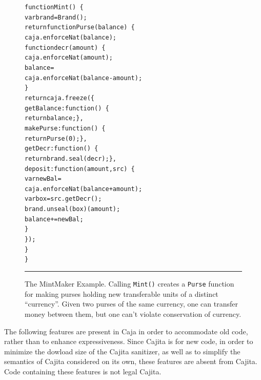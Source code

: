 \documentclass[letterpaper,twocolumn,10pt]{article}
\newcommand{\code}[1]{{\tt {#1}}}              %
\begin{document}
\begin{figure}[t!]
\begin{alltt}
function Mint()\ \{
  var brand = Brand();
  return function Purse(balance)\ \{
    caja.enforceNat(balance);
    function decr(amount)\ \{
      caja.enforceNat(amount);
      balance = 
        caja.enforceNat(balance - amount);
    \}
    return caja.freeze(\{
      getBalance: function()\ \{
        return balance; \},
      makePurse: function()\ \{
        return Purse(0); \},
      getDecr: function()\ \{
        return brand.seal(decr); \},
      deposit: function(amount,src)\ \{
        var newBal = 
          caja.enforceNat(balance+amount);
        var box = src.getDecr();
        brand.unseal(box)(amount);
        balance += newBal;
      \}
    \});
  \}
\}
\end{alltt}

\caption[The MintMaker Example]{The MintMaker Example. Calling \code{Mint()} 
creates a \code{Purse} function for making purses holding new transferable 
units of a distinct ``currency''. Given two purses of the same currency, one 
can transfer money between them, but one can't violate conservation of 
currency. \\ } \hrule
\label{fig:mintmaker}
\end{figure}




The following features are present in Caja in order to accommodate old code, 
rather than to enhance expressiveness. Since Cajita is for new code, in order 
to minimize the dowload size of the Cajita sanitizer, as well as to simplify 
the semantics of Cajita considered on its own, these features are absent from 
Cajita. Code containing these features is not legal Cajita.
\end{document}
